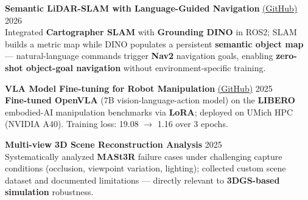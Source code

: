 \documentclass[9pt]{article}
\begin{document}
\textbf{Semantic LiDAR-SLAM with Language-Guided Navigation} \href{https://github.com/chittinvarunav/VLSGN_ROB530-Team21}{(GitHub)} \hfill 2026\\
Integrated \textbf{Cartographer SLAM} with \textbf{Grounding DINO} in ROS2; SLAM builds a metric map while DINO populates a persistent \textbf{semantic object map} --- natural-language commands trigger \textbf{Nav2} navigation goals, enabling \textbf{zero-shot object-goal navigation} without environment-specific training.

\textbf{VLA Model Fine-tuning for Robot Manipulation} \href{https://github.com/Thiruloksundar/OpenVLA-Libero-finetuning}{(GitHub)} \hfill 2025\\
\textbf{Fine-tuned OpenVLA} (7B vision-language-action model) on the \textbf{LIBERO} embodied-AI manipulation benchmarks via \textbf{LoRA}; deployed on UMich HPC (NVIDIA A40). Training loss: 19.08 $\rightarrow$ 1.16 over 3 epochs.

\textbf{Multi-view 3D Scene Reconstruction Analysis} \hfill 2025\\
Systematically analyzed \textbf{MASt3R} failure cases under challenging capture conditions (occlusion, viewpoint variation, lighting); collected custom scene dataset and documented limitations --- directly relevant to \textbf{3DGS-based simulation} robustness.
\end{document}
